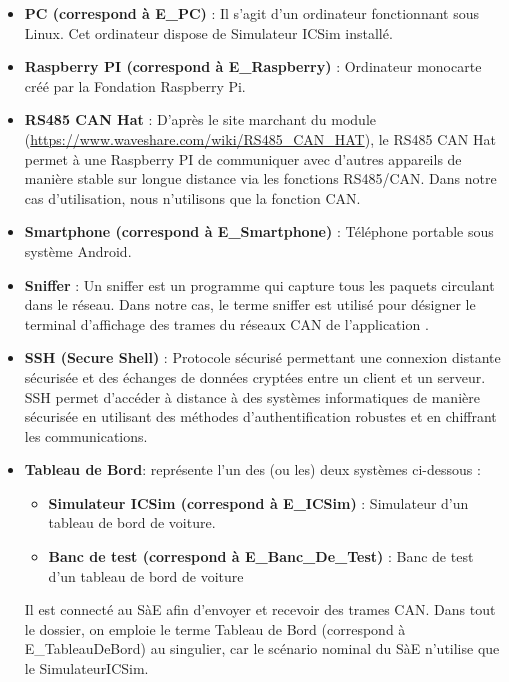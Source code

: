 \begin{itemize}
    \item \textbf{PC (correspond à E\_PC)} : Il s'agit d'un ordinateur fonctionnant sous Linux. Cet ordinateur dispose de Simulateur ICSim installé.\newline
    \item \textbf{Raspberry PI (correspond à E\_Raspberry)} : Ordinateur monocarte créé par la Fondation Raspberry Pi. \newline
    \item \textbf{RS485 CAN Hat} : D'après le site marchant du module (\href{https://www.waveshare.com/wiki/RS485_CAN_HAT}{https://www.waveshare.com/wiki/RS485\_CAN\_HAT}), le RS485 CAN Hat permet à une Raspberry PI de communiquer avec d'autres appareils de manière stable sur longue distance via les fonctions RS485/CAN. Dans notre cas d'utilisation, nous n'utilisons que la fonction CAN. \newline
    \item \textbf{Smartphone (correspond à E\_Smartphone)} : Téléphone portable sous système Android. \newline
    \item \textbf{Sniffer} : Un sniffer est un programme qui capture tous les paquets circulant dans le réseau. Dans notre cas, le terme sniffer est utilisé pour désigner le terminal d'affichage des trames du réseaux CAN de l'application {\nomApplication}. \newline
    \item \textbf{SSH (Secure Shell)} : Protocole sécurisé permettant une connexion distante sécurisée et des échanges de données cryptées entre un client et un serveur. SSH permet d'accéder à distance à des systèmes informatiques de manière sécurisée en utilisant des méthodes d'authentification robustes et en chiffrant les communications. \newline
    \item \textbf{Tableau de Bord}: représente l'un des (ou les) deux systèmes ci-dessous :
        \begin{itemize}
            \item \textbf{Simulateur ICSim (correspond à E\_ICSim)} : Simulateur d'un tableau de bord de voiture.
            \item \textbf{Banc de test (correspond à E\_Banc\_De\_Test)} : Banc de test d'un tableau de bord de voiture
        \end{itemize}
        Il est connecté au SàE afin d'envoyer et recevoir des trames CAN. 
        Dans tout le dossier, on emploie le terme Tableau de Bord (correspond à E\_TableauDeBord) au singulier, car le scénario nominal du SàE n'utilise que le SimulateurICSim.\newline

\end{itemize}
